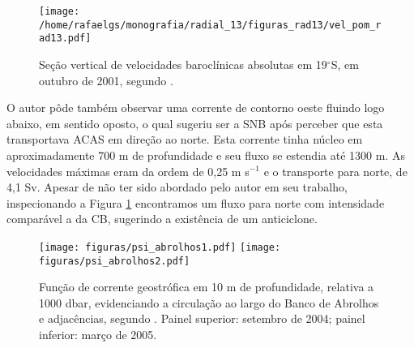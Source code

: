 \begin{figure}[hb]
 \begin{center}
  \texttt{[image: /home/rafaelgs/monografia/radial\_13/figuras\_rad13/vel\_pom\_rad13.pdf]}
 \end{center}
 \vspace{-.5cm}
 \renewcommand{\baselinestretch}{1}
 \caption{\label{fig:soutelino19} \small Seção vertical de velocidades baroclínicas absolutas em
19$^\circ$S, em outubro de 2001, segundo \cite{soutelino2005}.}
\end{figure}

O autor pôde também observar uma corrente de contorno oeste fluindo logo abaixo, em sentido 
oposto, o qual sugeriu ser a SNB após perceber que esta transportava ACAS em direção ao norte. 
Esta corrente tinha núcleo em aproximadamente 700 m de profundidade e seu fluxo se estendia até
1300 m. As velocidades máximas eram da ordem de 0,25 m s$^{-1}$ e o transporte para norte, de 4,1 Sv. 
Apesar de não ter sido abordado pelo autor em seu trabalho, inspecionando a Figura \ref{fig:soutelino19}
encontramos um fluxo para norte com intensidade comparável a da CB, sugerindo a 
existência de um anticiclone. 

\begin{figure}%
 \begin{center}
  \texttt{[image: figuras/psi\_abrolhos1.pdf]}
  \texttt{[image: figuras/psi\_abrolhos2.pdf]}
 \end{center}
 \vspace{-.5cm}
 \renewcommand{\baselinestretch}{1}
 \caption{\label{fig:abrolhos} \small Função de corrente geostrófica em 10 m de 
profundidade, relativa a 1000 dbar, evidenciando
a circulação ao largo do Banco de Abrolhos e adjacências, 
segundo \cite{silveira_etal2006B}. Painel superior: setembro de 2004; painel inferior: março de 2005.}
\end{figure}

